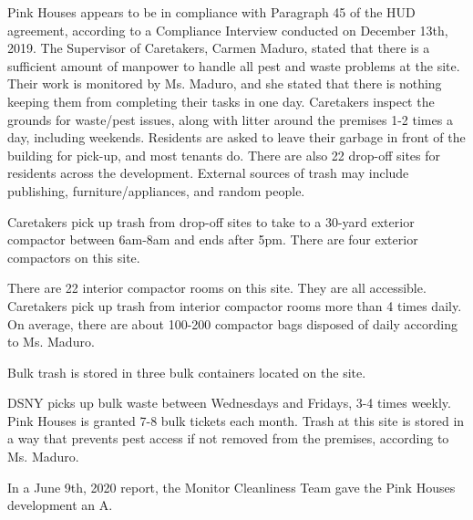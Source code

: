  

Pink Houses appears to be in compliance with Paragraph 45 of the HUD agreement, according to a Compliance Interview conducted on December 13th, 2019. The Supervisor of Caretakers, Carmen Maduro, stated that there is a sufficient amount of manpower to handle all pest and waste problems at the site. Their work is monitored by Ms. Maduro, and she stated that there is nothing keeping them from completing their tasks in one day. Caretakers inspect the grounds for waste/pest issues, along with litter around the premises 1-2 times a day, including weekends. Residents are asked to leave their garbage in front of the building for pick-up, and most tenants do. There are also 22 drop-off sites for residents across the development. External sources of trash may include publishing, furniture/appliances, and random people. 

Caretakers pick up trash from drop-off sites to take to a 30-yard exterior compactor between 6am-8am and ends after 5pm. There are four exterior compactors on this site. 

There are 22 interior compactor rooms on this site. They are all accessible. Caretakers pick up trash from interior compactor rooms more than 4 times daily. On average, there are about 100-200 compactor bags disposed of daily according to Ms. Maduro. 

Bulk trash is stored in three bulk containers located on the site. 

DSNY picks up bulk waste between Wednesdays and Fridays, 3-4 times weekly. Pink Houses is granted 7-8 bulk tickets each month. Trash at this site is stored in a way that prevents pest access if not removed from the premises, according to Ms. Maduro.  

In a June 9th, 2020 report, the Monitor Cleanliness Team gave the Pink Houses development an A. 
